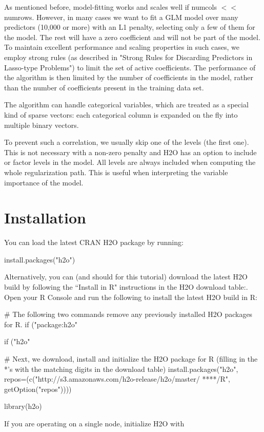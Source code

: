\documentclass[11pt]{article}
\begin{document}
As mentioned before, model-fitting works and scales well if numcols $<<$ numrows. However, in many cases we want to fit a GLM model over many predictors (10,000 or more) with an L1 penalty, selecting only a few of them for the model. The rest will have a zero coefficient and will not be part of the model. To maintain excellent performance and scaling properties in such cases, we employ strong rules  (as described in "Strong Rules for Discarding Predictors in Lasso-type Problems") to limit the set of active coefficients. The performance of the algorithm is then limited by the number of coefficients in the model, rather than the number of coefficients present in the training data set. 

The algorithm can handle categorical variables, which are treated as a special kind of sparse vectors: each categorical column is expanded on the fly into multiple binary vectors. 



To prevent such a correlation, we usually skip one of the levels (the first one). This is not necessary with a non-zero penalty and H2O has an option to include or factor levels in the model. All levels are always included when computing the whole regularization path. This is useful when interpreting the variable importance of the model. 

\section{Installation} 

You can load the latest CRAN H2O package by running:

\begin{spverbatim}
install.packages("h2o")
\end{spverbatim}
\bigskip
\noindent
Alternatively, you can (and should for this tutorial) download the latest H2O build by following the ``Install in R" instructions in the H2O download table:. Open your R Console and run the following to install the latest H2O build in R:

\begin{spverbatim}
# The following two commands remove any previously installed H2O packages for R.
if ("package:h2o" %

if ("h2o" %

# Next, we download, install and initialize the H2O package for R (filling in the *'s with the matching digits in the download table)
install.packages("h2o", repos=(c("http://s3.amazonaws.com/h2o-release/h2o/master/
****/R", getOption("repos"))))

library(h2o)

\end{spverbatim}
\noindent
If you are operating on a single node, initialize H2O with
\end{document}
